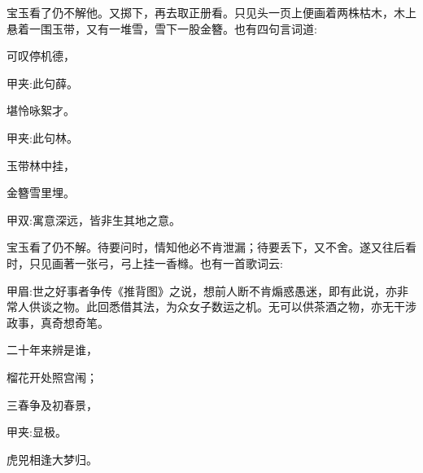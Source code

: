 \begin{parag}
    宝玉看了仍不解他。又掷下，再去取正册看。只见头一页上便画着两株枯木，木上悬着一围玉带，又有一堆雪，雪下一股金簪。也有四句言词道:
\end{parag}


\begin{poem}
    \begin{pl}可叹停机德，\end{pl}\begin{note}甲夹:此句薛。\end{note}

    \begin{pl}堪怜咏絮才。\end{pl}\begin{note}甲夹:此句林。\end{note}

    \begin{pl}玉带林中挂，\end{pl}

    \begin{pl}金簪雪里埋。\end{pl}\begin{note}甲双:寓意深远，皆非生其地之意。\end{note}

\end{poem}


\begin{parag}
    宝玉看了仍不解。待要问时，情知他必不肯泄漏；待要丢下，又不舍。遂又往后看时，只见画著一张弓，弓上挂一香橼。也有一首歌词云:\begin{note}甲眉:世之好事者争传《推背图》之说，想前人断不肯煽惑愚迷，即有此说，亦非常人供谈之物。此回悉借其法，为众女子数运之机。无可以供茶酒之物，亦无干涉政事，真奇想奇笔。\end{note}
\end{parag}


\begin{poem}
    \begin{pl}二十年来辨是谁，\end{pl}

    \begin{pl}榴花开处照宫闱；\end{pl}

    \begin{pl}三春争及初春景，\end{pl}\begin{note}甲夹:显极。\end{note}

    \begin{pl}虎兕相逢大梦归。\end{pl}
\end{poem}


